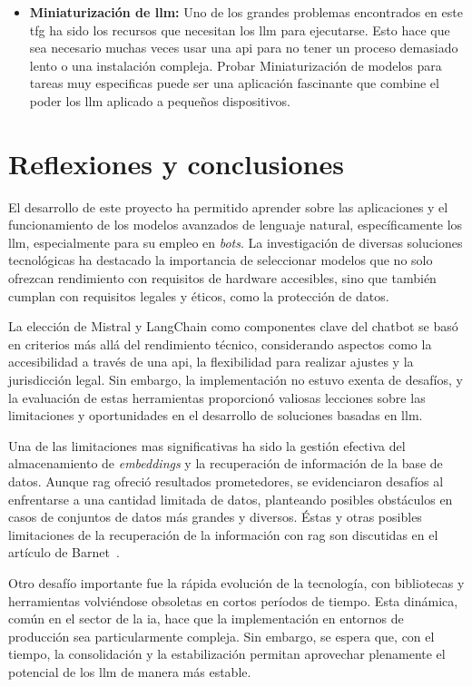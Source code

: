 \begin{itemize}
    \item \textbf{Miniaturización de \acrshort{llm}:} Uno de los grandes problemas encontrados en este \acrshort{tfg} ha sido los recursos que necesitan los \acrshort{llm} para ejecutarse. Esto hace que sea necesario muchas veces usar una \acrshort{api} para no tener un proceso demasiado lento o una instalación compleja. Probar Miniaturización de modelos para tareas muy especificas puede ser una aplicación fascinante que combine el poder los \acrshort{llm} aplicado a pequeños dispositivos.
\end{itemize}

\section{Reflexiones y conclusiones}

El desarrollo de este proyecto ha permitido aprender sobre las aplicaciones y el funcionamiento de los modelos avanzados de lenguaje natural, específicamente los \acrshort{llm}, especialmente para su empleo en \textit{bots}. La investigación de diversas soluciones tecnológicas ha destacado la importancia de seleccionar modelos que no solo ofrezcan rendimiento con requisitos de hardware accesibles, sino que también cumplan con requisitos legales y éticos, como la protección de datos.

La elección de Mistral y LangChain como componentes clave del chatbot se basó en criterios más allá del rendimiento técnico, considerando aspectos como la accesibilidad a través de una \acrshort{api}, la flexibilidad para realizar ajustes y la jurisdicción legal. Sin embargo, la implementación no estuvo exenta de desafíos, y la evaluación de estas herramientas proporcionó valiosas lecciones sobre las limitaciones y oportunidades en el desarrollo de soluciones basadas en \acrshort{llm}. 

Una de las limitaciones mas significativas ha sido la gestión efectiva del almacenamiento de \textit{embeddings} y la recuperación de información de la base de datos. Aunque \acrshort{rag} ofreció resultados prometedores, se evidenciaron desafíos al enfrentarse a una cantidad limitada de datos, planteando posibles obstáculos en casos de conjuntos de datos más grandes y diversos. Éstas y otras posibles limitaciones de la recuperación de la información con \acrshort{rag} son discutidas en el artículo de Barnet~\cite{barnett2024seven}.

Otro desafío importante fue la rápida evolución de la tecnología, con bibliotecas y herramientas volviéndose obsoletas en cortos períodos de tiempo. Esta dinámica, común en el sector de la \acrshort{ia}, hace que la implementación en entornos de producción sea particularmente compleja. Sin embargo, se espera que, con el tiempo, la consolidación y la estabilización permitan aprovechar plenamente el potencial de los \acrshort{llm} de manera más estable.

